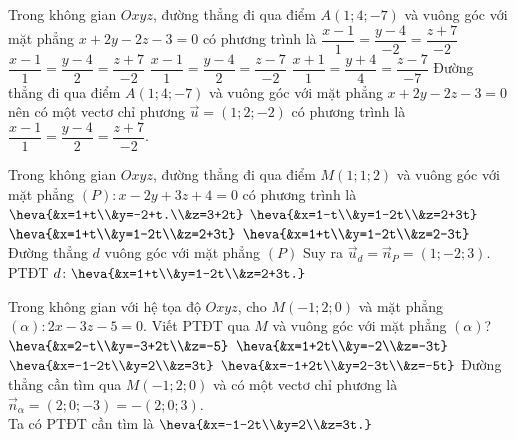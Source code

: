 \begin{ex}%
	Trong không gian $O x y z$, đường thẳng đi qua điểm $A(1;4;-7)$ và vuông góc với mặt phẳng $x+2y-2z-3=0$ có phương trình là 
	\choice 
	{$\dfrac{x-1}{1}=\dfrac{y-4}{-2}=\dfrac{z+7}{-2}$}
	{\True $\dfrac{x-1}{1}=\dfrac{y-4}{2}=\dfrac{z+7}{-2}$}
	{$\dfrac{x-1}{1}=\dfrac{y-4}{2}=\dfrac{z-7}{-2}$}
	{$\dfrac{x+1}{1}=\dfrac{y+4}{4}=\dfrac{z-7}{-7}$}
	\loigiai 
	{
Đường thẳng đi qua điểm $A(1;4;-7)$ và vuông góc với mặt phẳng $x+2y-2z-3=0$ nên có một vectơ chỉ phương $\vec{u}=(1;2;-2)$ có phương trình là $\dfrac{x-1}{1}=\dfrac{y-4}{2}=\dfrac{z+7}{-2}$.
	}
\end{ex}

\begin{ex}%
	Trong không gian $O x y z$, đường thẳng đi qua điểm $M(1;1;2)$ và vuông góc với mặt phẳng $(P)\colon x-2y+3z+4=0$ có phương trình là 
	\choice 
	{$\heva{&x=1+t\\&y=-2+t.\\&z=3+2t}$}
		{$\heva{&x=1-t\\&y=1-2t\\&z=2+3t}$}
			{\True $\heva{&x=1+t\\&y=1-2t\\&z=2+3t}$}
				{$\heva{&x=1+t\\&y=1-2t\\&z=2-3t}$}
					\loigiai 
					{
	Đường thẳng $d$ vuông góc với mặt phẳng $(P)$ Suy ra $\vec{u}_d=\vec{n}_P=(1;-2;3)$.\\
	PTĐT $d\colon \heva{&x=1+t\\&y=1-2t\\&z=2+3t.}$
					}
				\end{ex}
	
\begin{ex}%
	Trong không gian với hệ tọa độ $O x y z$, cho $M(-1;2;0)$ và mặt phẳng $(\alpha)\colon 2x-3z-5=0$. Viết PTĐT qua $M$ và vuông góc với mặt phẳng $(\alpha)$?
	\choice 
	{$\heva{&x=2-t\\&y=-3+2t\\&z=-5}$}
	{$\heva{&x=1+2t\\&y=-2\\&z=-3t}$}
	{\True $\heva{&x=-1-2t\\&y=2\\&z=3t}$}
	{$\heva{&x=-1+2t\\&y=2-3t\\&z=-5t}$}
		\loigiai 
	{
	Đường thẳng cần tìm qua $M(-1;2;0)$ và có một vectơ chỉ phương là $\vec{n}_{\alpha}=(2;0;-3)=-(2;0;3)$.\\
	Ta có PTĐT cần tìm là $\heva{&x=-1-2t\\&y=2\\&z=3t.}$
					}
				\end{ex}
			
